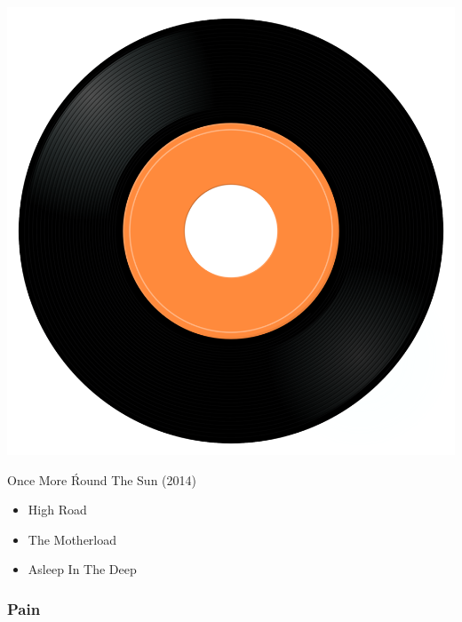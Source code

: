 \begin{minipage}[t]{0.25\textwidth}
\captionsetup{type=figure}
\includegraphics[width=\textwidth]{Images/cover.png}
\caption*{Once More \'Round The Sun (2014)}
\end{minipage}
\begin{minipage}[t]{0.25\textwidth}\vspace{0pt}
\begin{itemize}[nosep,leftmargin=1em,labelwidth=*,align=left]
	\setlength{\itemsep}{0pt}
	\item High Road
	\item The Motherload
	\item Asleep In The Deep
\end{itemize}
\end{minipage}

\subsubsection{Pain}

